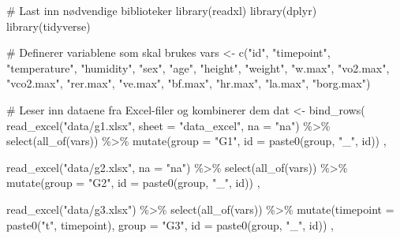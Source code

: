 \documentclass[
  letterpaper,
  DIV=11,
  numbers=noendperiod]{scrreprt}
\newenvironment{Shaded}{\begin{snugshade}}{\end{snugshade}}
\newcommand{\AttributeTok}[1]{\textcolor[rgb]{0.40,0.45,0.13}{#1}}
\newcommand{\CommentTok}[1]{\textcolor[rgb]{0.37,0.37,0.37}{#1}}
\newcommand{\FunctionTok}[1]{\textcolor[rgb]{0.28,0.35,0.67}{#1}}
\newcommand{\NormalTok}[1]{\textcolor[rgb]{0.00,0.23,0.31}{#1}}
\newcommand{\OtherTok}[1]{\textcolor[rgb]{0.00,0.23,0.31}{#1}}
\newcommand{\SpecialCharTok}[1]{\textcolor[rgb]{0.37,0.37,0.37}{#1}}
\newcommand{\StringTok}[1]{\textcolor[rgb]{0.13,0.47,0.30}{#1}}
\begin{document}
\begin{Shaded}
\begin{Highlighting}[]
\CommentTok{\# Last inn nødvendige biblioteker}
\FunctionTok{library}\NormalTok{(readxl)}
\FunctionTok{library}\NormalTok{(dplyr)}
\FunctionTok{library}\NormalTok{(tidyverse)}


\CommentTok{\# Definerer variablene som skal brukes}
\NormalTok{vars }\OtherTok{\textless{}{-}} \FunctionTok{c}\NormalTok{(}\StringTok{"id"}\NormalTok{, }\StringTok{"timepoint"}\NormalTok{, }\StringTok{"temperature"}\NormalTok{, }\StringTok{"humidity"}\NormalTok{, }
          \StringTok{"sex"}\NormalTok{, }\StringTok{"age"}\NormalTok{, }\StringTok{"height"}\NormalTok{, }\StringTok{"weight"}\NormalTok{, }\StringTok{"w.max"}\NormalTok{, }
          \StringTok{"vo2.max"}\NormalTok{, }\StringTok{"vco2.max"}\NormalTok{, }\StringTok{"rer.max"}\NormalTok{, }\StringTok{"ve.max"}\NormalTok{, }
          \StringTok{"bf.max"}\NormalTok{, }\StringTok{"hr.max"}\NormalTok{, }\StringTok{"la.max"}\NormalTok{, }
          \StringTok{"borg.max"}\NormalTok{)}

\CommentTok{\# Leser inn dataene fra Excel{-}filer og kombinerer dem}
\NormalTok{dat }\OtherTok{\textless{}{-}} \FunctionTok{bind\_rows}\NormalTok{(}
\FunctionTok{read\_excel}\NormalTok{(}\StringTok{"data/g1.xlsx"}\NormalTok{, }\AttributeTok{sheet =} \StringTok{"data\_excel"}\NormalTok{, }\AttributeTok{na =} \StringTok{"na"}\NormalTok{) }\SpecialCharTok{\%\textgreater{}\%}
  \FunctionTok{select}\NormalTok{(}\FunctionTok{all\_of}\NormalTok{(vars)) }\SpecialCharTok{\%\textgreater{}\%}
  \FunctionTok{mutate}\NormalTok{(}\AttributeTok{group =} \StringTok{"G1"}\NormalTok{, }
         \AttributeTok{id =} \FunctionTok{paste0}\NormalTok{(group, }\StringTok{"\_"}\NormalTok{, id)) ,}

\FunctionTok{read\_excel}\NormalTok{(}\StringTok{"data/g2.xlsx"}\NormalTok{, }\AttributeTok{na =} \StringTok{"na"}\NormalTok{) }\SpecialCharTok{\%\textgreater{}\%}
   \FunctionTok{select}\NormalTok{(}\FunctionTok{all\_of}\NormalTok{(vars)) }\SpecialCharTok{\%\textgreater{}\%}
  \FunctionTok{mutate}\NormalTok{(}\AttributeTok{group =} \StringTok{"G2"}\NormalTok{, }
         \AttributeTok{id =} \FunctionTok{paste0}\NormalTok{(group, }\StringTok{"\_"}\NormalTok{, id)) ,}

\FunctionTok{read\_excel}\NormalTok{(}\StringTok{"data/g3.xlsx"}\NormalTok{) }\SpecialCharTok{\%\textgreater{}\%}
   \FunctionTok{select}\NormalTok{(}\FunctionTok{all\_of}\NormalTok{(vars)) }\SpecialCharTok{\%\textgreater{}\%}
  \FunctionTok{mutate}\NormalTok{(}\AttributeTok{timepoint =} \FunctionTok{paste0}\NormalTok{(}\StringTok{"t"}\NormalTok{, timepoint), }
         \AttributeTok{group =} \StringTok{"G3"}\NormalTok{, }
         \AttributeTok{id =} \FunctionTok{paste0}\NormalTok{(group, }\StringTok{"\_"}\NormalTok{, id)) ,}


\end{Highlighting}
\end{Shaded}
\end{document}
